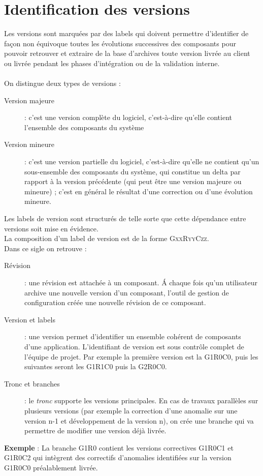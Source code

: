 \section{Identification des versions}
\label{versionning}
Les versions sont marquées par des labels qui doivent permettre d'identifier de façon non équivoque toutes les évolutions successives des composants pour pouvoir retrouver et extraire de la base d'archives toute version livrée au client ou livrée pendant les phases d'intégration ou de la validation interne.
\\\\
On distingue deux types de versions :
\begin{description}
	\item[Version majeure] : c'est une version complète du logiciel, c'est-à-dire qu'elle contient l'ensemble des composants du système
	\item[Version mineure] : c'est une version partielle du logiciel, c'est-à-dire qu'elle ne contient qu'un sous-ensemble des composants du système, qui constitue un delta par rapport à la version précédente
	(qui peut être une version majeure ou mineure) ; c'est en général le résultat d'une correction ou d'une évolution mineure.
\end{description}
Les labels de version sont structurés de telle sorte que cette dépendance entre versions soit mise en évidence.
\\La composition d'un label de version est de la forme \textsc{GxxRyyCzz}.
\\Dans ce sigle on retrouve :
\begin{description}
	\item[Révision] : une révision est attachée à un composant. \'A chaque fois qu'un utilisateur archive une nouvelle version d'un composant, l'outil de gestion de configuration créée une nouvelle révision de ce composant.
	\item[Version et labels] : une version permet d'identifier un ensemble cohérent de composants d'une application. L'identifiant de version est sous contrôle complet de l'équipe de projet. Par exemple la première version est la G1R0C0, puis les suivantes seront les
	G1R1C0 puis la G2R0C0.
	\item[Tronc et branches] : le \textit{tronc} supporte les versions principales. En cas de travaux parallèles sur plusieurs versions (par exemple la correction d'une anomalie sur une version n-1 et développement de la version n), on crée une branche qui va permettre de modifier une version déjà livrée.
	\\
\end{description}
\textbf{Exemple} : La branche G1R0 contient les versions correctives G1R0C1 et G1R0C2 qui intègrent des correctifs d'anomalies identifiées sur la version G1R0C0 préalablement livrée.
\setlength{\unitlength}{1.3cm}

